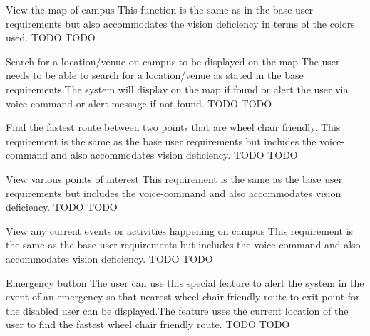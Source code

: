 \FuncReq
{View the map of campus}
{This function is the same as in the base user requirements but also accommodates the vision deficiency in terms of the colors used.}
{TODO}
{TODO}

\FuncReq
{Search for a location/venue on campus to be displayed on the map}
{The user needs to be able to search for a location/venue as stated in the base requirements.The system will display on the map if found or alert the user via voice-command or alert message if not found.}
{TODO}
{TODO}

\FuncReq
{Find the fastest route between two points that are wheel chair friendly.}%
{ This requirement is the same as the base user requirements but includes the voice-command and also accommodates vision deficiency.}
{TODO}
{TODO}

\FuncReq
{View various points of interest}
{This requirement is the same as the base user requirements but includes the voice-command and also accommodates vision deficiency.}
{TODO}
{TODO}

\FuncReq
{View any current events or activities happening on campus}
{This requirement is the same as the base user requirements but includes the voice-command and also accommodates vision deficiency.}
{TODO}
{TODO}

\FuncReq
{Emergency button }
{The user can use this special feature to alert the system in the event of an emergency so that nearest wheel chair friendly route to exit point for the disabled user can be displayed.The feature uses the current location of the user to find the fastest wheel chair friendly route.}
{TODO}
{TODO}
